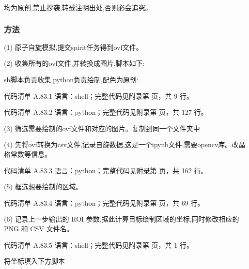 \documentclass[lang=cn,scheme=chinese,color=blue,device=normal,toc=onecol,math=cm]{elegantbook}
\begin{document}
均为原创,禁止抄袭,转载注明出处,否则必会追究。\par


\subsubsection{方法}


(1) 原子自旋模拟,提交spirit任务得到ovf文件。\par


(2) 收集所有的ovf文件,并转换成图片,脚本如下:\par


sh脚本负责收集,python负责绘制,配色为原创:\par


\begin{codeindexbox}{代码清单 A.83.1}
语言：shell；完整代码见附录第 \pageref{code:83:1} 页，共 9 行。
\end{codeindexbox}


\begin{codeindexbox}{代码清单 A.83.2}
语言：python；完整代码见附录第 \pageref{code:83:2} 页，共 127 行。
\end{codeindexbox}


(3) 筛选需要绘制的ovf文件和对应的图片。复制到同一个文件夹中\par


(4) 先将ovf转换为csv文件,记录自旋数据,这是一个ipynb文件,需要opencv库。改晶格常数等信息。\par


\begin{codeindexbox}{代码清单 A.83.3}
语言：python；完整代码见附录第 \pageref{code:83:3} 页，共 162 行。
\end{codeindexbox}


(5) 框选想要绘制的区域。\par


\begin{codeindexbox}{代码清单 A.83.4}
语言：python；完整代码见附录第 \pageref{code:83:4} 页，共 69 行。
\end{codeindexbox}


(6) 记录上一步输出的 ROI 参数,据此计算目标绘制区域的坐标,同时修改相应的 PNG 和 CSV 文件名。\par


\begin{codeindexbox}{代码清单 A.83.5}
语言：shell；完整代码见附录第 \pageref{code:83:5} 页，共 1 行。
\end{codeindexbox}


将坐标填入下方脚本\par
\end{document}
